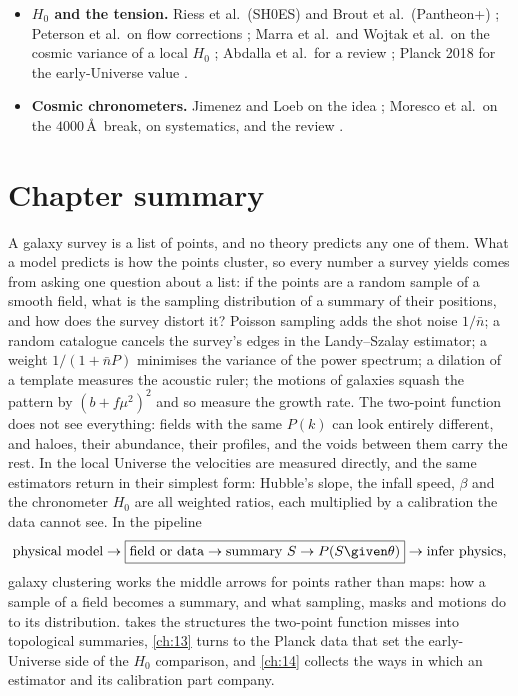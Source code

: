\begin{itemize}[itemsep=2pt,leftmargin=1.2em]
        \cite{LyndenBell1988}; Strauss and Willick's review of peculiar velocities and
        Malmquist bias \cite{StraussWillick1995}; Watkins and Feldman on the logarithmic
        estimator \cite{WatkinsFeldman2015}; Carrick et al.\ on velocities from 2M++
        \cite{Carrick2015}; Tully et al., Cosmicflows-4 \cite{Tully2023CF4}; Planck 2018
        for the dipole \cite{Planck2018I}.
  \item \textbf{$H_0$ and the tension.} Riess et al.\ (SH0ES) and Brout et al.\
        (Pantheon+) \cite{Riess2022SH0ES,Brout2022PantheonPlus}; Peterson et al.\ on flow
        corrections \cite{Peterson2022}; Marra et al.\ and Wojtak et al.\ on the cosmic
        variance of a local $H_0$ \cite{Marra2013,Wojtak2014}; Abdalla et al.\ for a review
        \cite{Abdalla2022}; Planck 2018 for the early-Universe value \cite{Planck2018VI}.
  \item \textbf{Cosmic chronometers.} Jimenez and Loeb on the idea \cite{JimenezLoeb2002};
        Moresco et al.\ on the $4000$\,\AA\ break, on systematics, and the review
        \cite{Moresco2016,Moresco2020,Moresco2022}.
\end{itemize}

\section*{Chapter summary}
\label{11c:sec:summary}

A galaxy survey is a list of points, and no theory predicts any one of them. What a
model predicts is how the points cluster, so every number a survey yields comes from
asking one question about a list: if the points are a random sample of a smooth field,
what is the sampling distribution of a summary of their positions, and how does the
survey distort it? Poisson sampling adds the shot noise $1/\bar n$; a random catalogue
cancels the survey's edges in the Landy--Szalay estimator; a weight $1/(1+\bar nP)$
minimises the variance of the power spectrum; a dilation of a template measures the
acoustic ruler; the motions of galaxies squash the pattern by $(b+f\mu^2)^2$ and so
measure the growth rate. The two-point function does not see everything: fields with
the same $P(k)$ can look entirely different, and haloes, their abundance, their
profiles, and the voids between them carry the rest. In the local Universe the
velocities are measured directly, and the same estimators return in their simplest
form: Hubble's slope, the infall speed, $\beta$ and the chronometer $H_0$ are all
weighted ratios, each multiplied by a calibration the data cannot see. In the pipeline
\[
  \text{physical model}\to\boxed{\text{field or data}\to\text{summary }S\to P(S\given\theta)}\to\text{infer physics},
\]
galaxy clustering works the middle arrows for points rather than maps: how a sample of a
field becomes a summary, and what sampling, masks and motions do to its distribution.
\Cref{ch:12} takes the structures the two-point function misses into topological
summaries, \cref{ch:13} turns to the Planck data that set the early-Universe side of the $H_0$
comparison, and
\cref{ch:14} collects the ways in which an estimator and its calibration part company.

